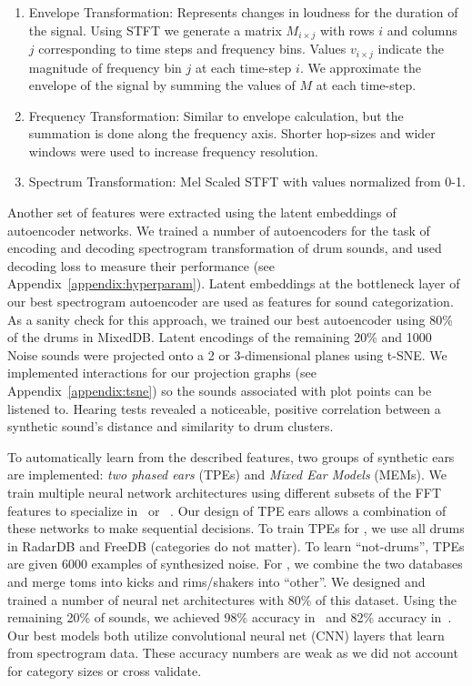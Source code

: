 \documentclass[runningheads,a4paper]{llncs}
\begin{document}
\begin{enumerate}
\item Envelope Transformation: Represents changes in loudness for the duration of the signal. Using STFT we generate a matrix $M_{i \times j}$ with rows $i$ and columns $j$ corresponding to time steps and frequency bins. Values $v_{i \times j}$ indicate the magnitude of frequency bin $j$ at each time-step $i$. We approximate the envelope of the signal by summing the values of $M$ at each time-step. 
\item Frequency Transformation:  Similar to envelope calculation, but the summation is done along the frequency axis. Shorter hop-sizes and wider windows were used to increase frequency resolution. 
\item Spectrum Transformation: Mel Scaled STFT with values normalized from 0-1. 
\end{enumerate}
Another set of features were extracted using the latent embeddings of autoencoder networks. We trained a number of autoencoders for the task of encoding and decoding spectrogram transformation of drum sounds, and used decoding loss to measure their performance (see Appendix~\ref{appendix:hyperparam}). Latent embeddings at the bottleneck layer of our best spectrogram autoencoder are used as features for sound categorization.  As a sanity check for this approach, we trained our best autoencoder using 80\% of the drums in MixedDB. Latent encodings of the remaining 20\% and 1000 Noise sounds were projected onto a 2 or 3-dimensional planes using t-SNE. We implemented interactions for our projection graphs (see Appendix~\ref{appendix:tsne}) so the sounds associated with plot points can be listened to. Hearing tests revealed a noticeable, positive correlation between a synthetic sound's distance and similarity to drum clusters.

To automatically learn from the described features, two groups of synthetic ears are implemented: \emph{two phased ears} (TPEs) and \emph{Mixed Ear Models} (MEMs). We train multiple neural network architectures using different subsets of the FFT features to specialize in \decfirst~or \decsecond~. Our design of TPE ears allows a combination of these networks to make sequential decisions. To train TPEs for \decfirst, we use all drums in RadarDB and FreeDB (categories do not matter). To learn \enquote{not-drums}, TPEs are given 6000 examples of synthesized noise. For \decsecond, we combine the two databases and merge toms into kicks and rims/shakers into \enquote{other}. We designed and trained a number of neural net architectures with 80\% of this dataset. Using the remaining 20\% of sounds, we achieved 98\% accuracy in \decfirst~and 82\% accuracy in~\decsecond. Our best models both utilize convolutional neural net (CNN) layers that learn from spectrogram data. These accuracy numbers are weak as we did not account for category sizes or cross validate.
\end{document}
